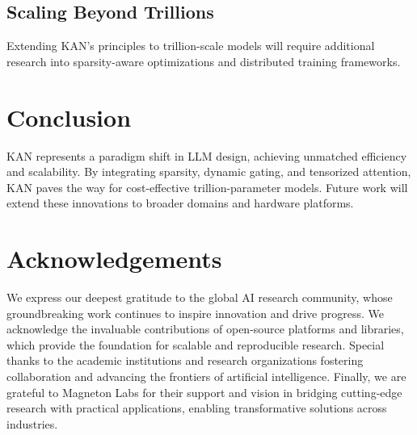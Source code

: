 \documentclass[twocolumn]{article}
\begin{document}
\subsection{Scaling Beyond Trillions}
Extending KAN's principles to trillion-scale models will require additional research into sparsity-aware optimizations and distributed training frameworks.

\section{Conclusion}
KAN represents a paradigm shift in LLM design, achieving unmatched efficiency and scalability. By integrating sparsity, dynamic gating, and tensorized attention, KAN paves the way for cost-effective trillion-parameter models. Future work will extend these innovations to broader domains and hardware platforms.

\section*{Acknowledgements}
We express our deepest gratitude to the global AI research community, whose groundbreaking work continues to inspire innovation and drive progress. We acknowledge the invaluable contributions of open-source platforms and libraries, which provide the foundation for scalable and reproducible research. Special thanks to the academic institutions and research organizations fostering collaboration and advancing the frontiers of artificial intelligence. Finally, we are grateful to Magneton Labs for their support and vision in bridging cutting-edge research with practical applications, enabling transformative solutions across industries.



\end{document}
